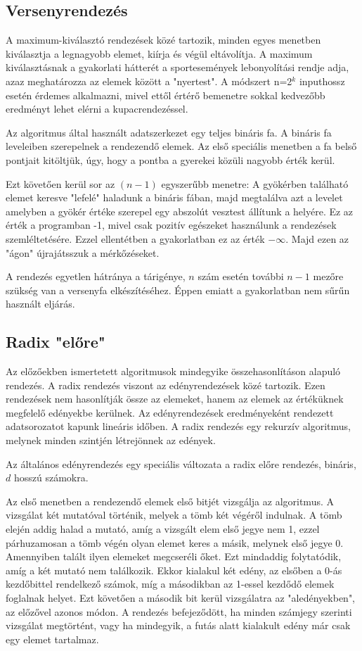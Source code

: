 \documentclass{elteikthesis}
\begin{document}
\subsection{Versenyrendezés}
A maximum-kiválasztó rendezések közé tartozik, minden egyes menetben kiválasztja a legnagyobb elemet, kiírja és végül eltávolítja. A maximum kiválasztásnak a gyakorlati hátterét a sportesemények lebonyolítási rendje adja, azaz meghatározza az elemek között a "nyertest"\cite{Fekete}. A módszert n=2$^k$ inputhossz esetén érdemes alkalmazni, mivel ettől értérő bemenetre sokkal kedvezőbb eredményt lehet elérni a kupacrendezéssel\cite{Fekete}. \par
Az algoritmus által használt adatszerkezet egy teljes bináris fa. A bináris fa leveleiben szerepelnek a rendezendő elemek. Az első speciális menetben a fa belső pontjait kitöltjük, úgy, hogy a pontba a gyerekei közüli nagyobb érték kerül.\par 
Ezt követően kerül sor az $(n-1)$ egyszerűbb menetre: A gyökérben található elemet keresve "lefelé" haladunk a bináris fában, majd megtalálva azt a levelet amelyben a gyökér értéke szerepel egy abszolút vesztest állítunk a helyére. Ez az érték a programban -1, mivel csak pozitív egészeket használunk a rendezések szemléltetésére. Ezzel ellentétben a gyakorlatban ez az érték $-\infty$. Majd ezen az "ágon" újrajátsszuk a mérkőzéseket.
\par
A rendezés egyetlen hátránya a tárigénye, $n$ szám esetén további $n-1$ mezőre szükség van a versenyfa elkészítéséhez. Éppen emiatt a gyakorlatban nem sűrűn használt eljárás.

\subsection{Radix "előre"}
Az előzőekben ismertetett algoritmusok mindegyike összehasonlításon alapuló rendezés. A radix rendezés viszont az edényrendezések közé tartozik. Ezen rendezések nem hasonlítják össze az elemeket, hanem az elemek az értéküknek megfelelő edényekbe kerülnek. Az edényrendezések eredményeként rendezett adatsorozatot kapunk lineáris időben. A radix rendezés egy rekurzív algoritmus, melynek minden szintjén létrejönnek az edények.\par
Az általános edényrendezés egy speciális változata a radix előre rendezés, bináris, $d$ hosszú számokra.\par
Az első menetben a rendezendő elemek első bitjét vizsgálja az algoritmus. A vizsgálat két mutatóval történik, melyek a tömb két végéről indulnak. A tömb elején addig halad a mutató, amíg a vizsgált elem első jegye nem 1, ezzel párhuzamosan a tömb végén olyan elemet keres a másik, melynek első jegye 0. Amennyiben talált ilyen elemeket megcseréli őket. Ezt mindaddig folytatódik, amíg a két mutató nem találkozik. Ekkor kialakul két edény, az elsőben a 0-ás kezdőbittel rendelkező számok, míg a másodikban az 1-essel kezdődő elemek foglalnak helyet. Ezt követően a második bit kerül vizsgálatra az "aledényekben", az előzővel azonos módon. A rendezés befejeződött, ha minden számjegy szerinti vizsgálat megtörtént, vagy ha mindegyik, a futás alatt kialakult edény már csak egy elemet tartalmaz.
\end{document}
